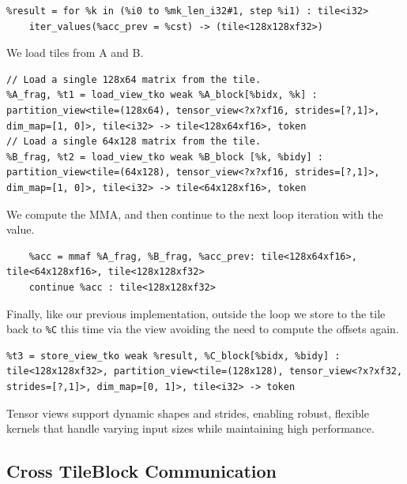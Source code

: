 \documentclass{article}
\begin{document}
\begin{lstlisting}
%result = for %k in (%i0 to %mk_len_i32#1, step %i1) : tile<i32>
    iter_values(%acc_prev = %cst) -> (tile<128x128xf32>)
\end{lstlisting}

We load tiles from A and B.


\begin{lstlisting}
// Load a single 128x64 matrix from the tile.
%A_frag, %t1 = load_view_tko weak %A_block[%bidx, %k] : partition_view<tile=(128x64), tensor_view<?x?xf16, strides=[?,1]>, dim_map=[1, 0]>, tile<i32> -> tile<128x64xf16>, token
// Load a single 64x128 matrix from the tile.
%B_frag, %t2 = load_view_tko weak %B_block [%k, %bidy] : partition_view<tile=(64x128), tensor_view<?x?xf16, strides=[?,1]>, dim_map=[1, 0]>, tile<i32> -> tile<64x128xf16>, token
\end{lstlisting}

We compute the MMA, and then continue to the next loop iteration with the value.


\begin{lstlisting}
    %acc = mmaf %A_frag, %B_frag, %acc_prev: tile<128x64xf16>, tile<64x128xf16>, tile<128x128xf32>
    continue %acc : tile<128x128xf32>
\end{lstlisting}

Finally, like our previous implementation, outside the loop we store to the tile back to \texttt{\%C} this time via the view avoiding the need to compute the offsets again.


\begin{lstlisting}
%t3 = store_view_tko weak %result, %C_block[%bidx, %bidy] : tile<128x128xf32>, partition_view<tile=(128x128), tensor_view<?x?xf32, strides=[?,1]>, dim_map=[0, 1]>, tile<i32> -> token
\end{lstlisting}

Tensor views support dynamic shapes and strides, enabling robust, flexible kernels that handle varying input sizes while maintaining high performance.



\subsection{Cross TileBlock Communication}
\end{document}
